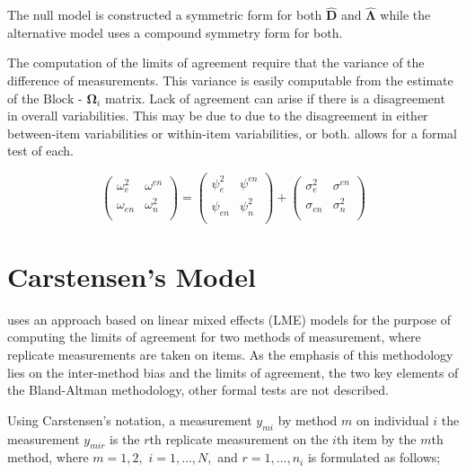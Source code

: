 \documentclass[12pt, a4paper]{report}
\theoremstyle{plain}
\theoremstyle{definition}
\theoremstyle{remark}
\begin{document}
	The null model is constructed a symmetric form for both $\boldsymbol{\hat{D}}$ and $\boldsymbol{\hat{\Lambda}}$ while the alternative model uses a compound symmetry form for both.
	

	The computation of the limits of agreement require that the variance of the difference of measurements. This variance is easily computable from the estimate of the ${\mbox{Block - }\boldsymbol \Omega_{i}}$ matrix. Lack of agreement can arise if there is a disagreement in overall variabilities. This may be due to due to the disagreement in either between-item
	variabilities or within-item variabilities, or both. \citet{ARoy2009} allows for a formal test of each.
	
	\begin{equation}
	\left( \begin{array}{cc}
	\omega^2_{e} & \omega^{en} \\
	\omega_{en} & \omega^2_{n} \\
	\end{array}\right)
	=
	\left( \begin{array}{cc}
	\psi^2_{e} & \psi^{en} \\
	\psi_{en} & \psi^2_{n} \\
	\end{array}\right)
	+
	\left( \begin{array}{cc}
	\sigma^2_{e} & \sigma^{en} \\
	\sigma_{en} & \sigma^2_{n} \\
	\end{array}\right)
	\end{equation}
	
		\newpage
\section{Carstensen's Model}
\citet{BXC2008} uses an approach based on linear mixed effects (LME) models for the purpose of computing the limits of agreement for two methods of measurement, where replicate measurements are taken on items. As the emphasis of this methodology lies on the inter-method bias and the limits of agreement, the two key elements of the Bland-Altman methodology, other formal tests are not described.


Using Carstensen's notation, a measurement $y_{mi}$ by method $m$ on individual $i$ the measurement $y_{mir} $ is the $r$th replicate measurement on the $i$th item by the $m$th method, where $m=1,2,$ $i=1,\ldots,N,$ and $r = 1,\ldots,n_i$ is formulated as follows;
\end{document}

